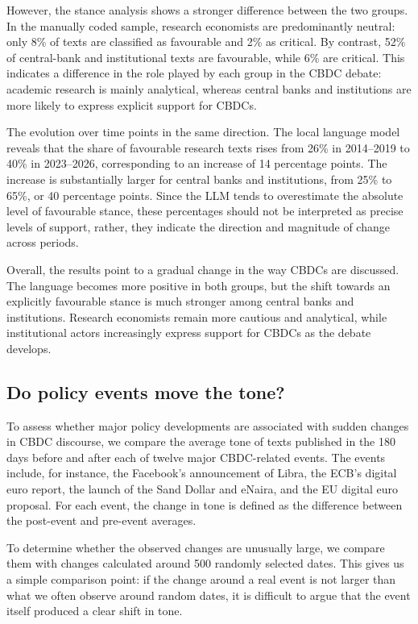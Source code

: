 \documentclass[11pt,a4paper]{article}
\begin{document}
However, the stance analysis shows a stronger difference between the two groups. In the manually coded sample, research economists 
are predominantly neutral: only 8\% of texts are classified as favourable and 2\% as critical. By contrast, 52\% of central-bank 
and institutional texts are favourable, while 6\% are critical. This indicates a difference in the role played by each group in 
the CBDC debate: academic research is mainly analytical, whereas central banks and institutions are more likely to express explicit 
support for CBDCs.

The evolution over time points in the same direction. The local language model reveals that the share of favourable research texts 
rises from 26\% in 2014–2019 to 40\% in 2023–2026, corresponding to an increase of 14 percentage points. The increase is substantially 
larger for central banks and institutions, from 25\% to 65\%, or 40 percentage points. Since the LLM tends to overestimate the absolute 
level of favourable stance, these percentages should not be interpreted as precise levels of support, rather, they indicate the direction 
and magnitude of change across periods.

Overall, the results point to a gradual change in the way CBDCs are discussed. The language becomes more positive in both groups, 
but the shift towards an explicitly favourable stance is much stronger among central banks and institutions. Research economists 
remain more cautious and analytical, while institutional actors increasingly express support for CBDCs as the debate develops.

\subsection{Do policy events move the tone?}
To assess whether major policy developments are associated with sudden changes in CBDC discourse, we compare the average tone of texts 
published in the 180 days before and after each of twelve major CBDC-related events. The events include, for instance, the Facebook’s 
announcement of Libra, the ECB’s digital euro report, the launch of the Sand Dollar and eNaira, and the EU digital euro proposal. 
For each event, the change in tone is defined as the difference between the post-event and pre-event averages.

To determine whether the observed changes are unusually large, we compare them with changes calculated around 500 randomly selected dates. 
This gives us a simple comparison point: if the change around a real event is not larger than what we often observe around random dates, 
it is difficult to argue that the event itself produced a clear shift in tone.
\end{document}
